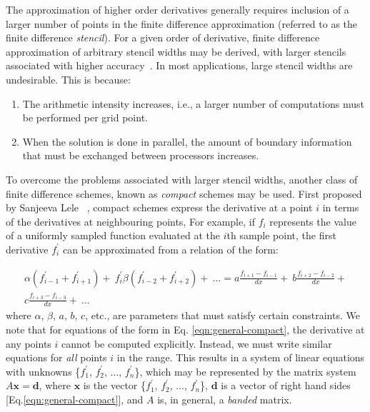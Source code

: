 The approximation of higher order derivatives generally requires
inclusion of a larger number of points in the
finite difference approximation
(referred to as the finite difference \emph{stencil}).
For a given order of derivative,
finite difference approximation of arbitrary stencil widths
may be derived,
with larger stencils associated with higher accuracy~\cite{fornberg1988generation}.
In most applications,
large stencil widths are undesirable.
This is because:

\begin{enumerate}
    \item The arithmetic intensity increases, i.e.,
        a larger number of computations must be performed per grid point.
    \item When the solution is done in parallel,
        the amount of boundary information that must be exchanged
        between processors increases.
\end{enumerate}

To overcome the problems associated with larger stencil widths,
another class of finite difference schemes,
known as \emph{compact} schemes may be used.
First proposed by Sanjeeva Lele ~\cite{lele1992compact},
compact schemes express the derivative at a point $i$
in terms of the derivatives at neighbouring points,
For example,
if $f_i$ represents the value of
a uniformly sampled function evaluated at the $i$th sample point,
the first derivative $f^{\prime}_i$ can be approximated from
a relation of the form:

\begin{equation}
\begin{split}
    \alpha(f^{\prime}_{i-1} + f^{\prime}_{i+1}) + \
        f^{\prime}_i
    \beta(f^{\prime}_{i-2} + f^{\prime}_{i+2}) + \
    \hdots
    = 
    a\frac{f_{i+1} - f_{i-1}}{dx} + \
    b\frac{f_{i+2} - f_{i-2}}{dx} + \\
    c\frac{f_{i+3} - f_{i-3}}{dx} + \
    \hdots
\end{split}
\label{eqn:general-compact}
\end{equation}
%
where $\alpha$, $\beta$, $a$, $b$, $c$, etc.,
are parameters that must satisfy certain constraints.
We note that for equations of the form in Eq. \ref{eqn:general-compact},
the derivative at any points $i$ cannot be computed explicitly.
Instead, we must write similar equations for \emph{all} points $i$
in the range.
This results in a system of linear equations
with unknowns \{$f^{\prime}_1$, $f^{\prime}_2$, $\hdots$, $f^{\prime}_n$\},
which may be represented by the matrix system $A\bm{x}=\bm{d}$,
where $\bm{x}$ is the vector
\{$f^{\prime}_1$, $f^{\prime}_2$, $\hdots$, $f^{\prime}_n$\},
$\bm{d}$ is a vector of right hand sides [Eq.\ref{eqn:general-compact}],
and $A$ is, in general, a \emph{banded} matrix.

